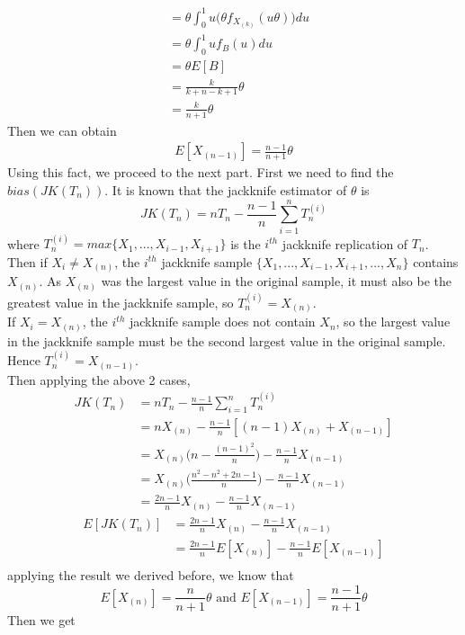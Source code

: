 \documentclass[a4paper,11pt]{article}
\begin{document}
\begin{enumerate}[a)]
\begin{enumerate}[i)]
\begin{align*}
			&= \theta \int^1_0 u\bigg(\theta  f_{X_{(k)}}(u\theta )  \bigg) du \\
			&=\theta \int^1_0 u  f_{B}(u) du\\
			&= \theta E[B]\\
			&= \frac{k}{k+n-k+1}\theta\\
			&= \frac{k}{n+1} \theta  
		\end{align*}
	Then we can obtain
		\begin{align*}
			E[X_{(n-1)}] =  \frac{n-1}{n+1} \theta  
		\end{align*}
	Using this fact, we proceed to the next part. First we need to find the $bias(JK(T_n))$. It is known that the jackknife estimator of $\theta$ is 
	\[
		JK(T_n) = nT_n - \frac{n-1}{n}\sum^n_{i=1} T^{(i)}_n
	\]
	where $T^{(i)}_n = max\{ X_1, ... , X_{i-1},X_{i+1}\}$ is the $i^{th}$ jackknife replication of $T_n$.\\
	Then if $X_i \ne X_{(n)}$, the  $i^{th}$ jackknife sample $\{ X_1, ... , X_{i-1},X_{i+1},..., X_n\}$ contains $X_{(n)}$. As $X_{(n)}$ was the largest value in the original sample, it must also be the greatest value in the jackknife sample, so $T^{(i)}_n = X_{(n)}$.\\
	If $X_i = X_{(n)}$, the  $i^{th}$ jackknife sample does not contain $X_n$, so the largest value in the jackknife sample must be the second largest value in the original sample. Hence $T^{(i)}_n = X_{(n-1)}$.\\
	Then applying the above 2 cases,
	\begin{align*}
		JK(T_n) &= nT_n - \frac{n-1}{n} \sum^n_{i=1} T_n^{(i)}\\
		&= nX_{(n)} - \frac{n-1}{n}[(n-1)X_{(n)} + X_{(n-1)} ]\\
		&=X_{(n)}\bigg(n - \frac{(n-1)^2}{n}  \bigg) -\frac{n-1}{n}X_{(n-1)}\\
		&=X_{(n)}\bigg(\frac{n^2-n^2 +2n -1}{n}  \bigg) -\frac{n-1}{n}X_{(n-1)}\\
		&= \frac{2n-1}{n}X_{(n)} - \frac{n-1}{n}X_{(n-1)}
	\end{align*}
	\begin{align*}
		E[JK(T_n)] &= \frac{2n-1}{n}X_{(n)} - \frac{n-1}{n}X_{(n-1)}\\
		&= \frac{2n-1}{n} E[X_{(n)}] - \frac{n-1}{n}E[X_{(n-1)}]\\
	\end{align*}
	applying the result we derived before, we know that
	\[
	E[X_{(n)}] =  \frac{n}{n+1}\theta \mbox{ and } E[X_{(n-1)}] =  \frac{n-1}{n+1}\theta
	\]
	Then we get
	\begin{align*}

\end{align*}
\end{enumerate}
\end{enumerate}
\end{document}
